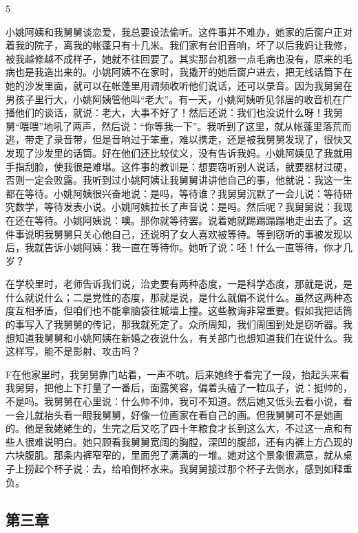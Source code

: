 5 

小姚阿姨和我舅舅谈恋爱，我总要设法偷听。这件事并不难办，她家的后窗户正对着我的院子，离我的帐蓬只有十几米。我们家有台旧音响，坏了以后我妈让我修，被我越修越不成样子，她就不往回要了。其实那台机器一点毛病也没有，原来的毛病也是我造出来的。小姚阿姨不在家时，我撬开的她后窗户进去，把无线话筒下在她的沙发里面，就可以在帐蓬里用调频收听他们说话，还可以录音。因为我舅舅在男孩子里行大，小姚阿姨管他叫“老大”。有一天，小姚阿姨听见邻居的收音机在广播他们的谈话，就说：老大，大事不好了！然后还说：我们也没说什么呀！我舅舅“喂喂”地吼了两声，然后说：“你等我一下”。我听到了这里，就从帐蓬里落荒而逃，带走了录音带，但是音响过于笨重，难以携走，还是被我舅舅发现了，很快又发现了沙发里的话筒。好在他们还比较仗义，没有告诉我妈。小姚阿姨见了我就用手指刮脸，使我很是难堪。这件事的教训是：想要窃听别人说话，就要器材过硬，否则一定会败露。我听到过小姚阿姨让我舅舅讲讲他自己的事，他就说：我这一生都在等待。小姚阿姨很兴奋地说：是吗，等待谁？我舅舅沉默了一会儿说：等待研究数学，等待发表小说。小姚阿姨拉长了声音说：是吗。然后呢？我舅舅说：我现在还在等待。小姚阿姨说：噢。那你就等待罢。说着她就踢踢蹋蹋地走出去了。这件事说明我舅舅只关心他自己，还说明了女人喜欢被等待。等到窃听的事被发现以后，我就告诉小姚阿姨：我一直在等待你。她听了说：呸！什么一直等待，你才几岁？ 

在学校里时，老师告诉我们说，治史要有两种态度，一是科学态度，那就是说，是什么就说什么；二是党性的态度，那就是说，是什么就偏不说什么。虽然这两种态度互相矛盾，但咱们也不能拿脑袋往城墙上撞。这些教诲非常重要。假如我把话筒的事写入了我舅舅的传记，那我就死定了。众所周知，我们周围到处是窃听器。我想知道我舅舅和小姚阿姨在新婚之夜说什么，有关部门也想知道我们在说什么。我这样写，能不是影射、攻击吗？ 

F在他家里时，我舅舅靠门站着，一声不吭。后来她终于看完了一段，抬起头来看我舅舅，把他上下打量了一番后，面露笑容，偏着头磕了一粒瓜子，说：挺帅的，不是吗。我舅舅在心里说：什么帅不帅，我可不知道。然后她又低头去看小说，看一会儿就抬头看一眼我舅舅，好像一位画家在看自己的画。但我舅舅可不是她画的。他是我姥姥生的，生完之后又吃了四十年粮食才长到这么大，不过这一点和有些人很难说明白。她只顾看我舅舅宽阔的胸膛，深凹的腹部，还有内裤上方凸现的六块腹肌。那条内裤窄窄的，里面兜了满满的一堆。她对这个景象很满意，就从桌子上捞起个杯子说：去，给咱倒杯水来。我舅舅接过那个杯子去倒水，感到如释重负。

\subsection{第三章}

